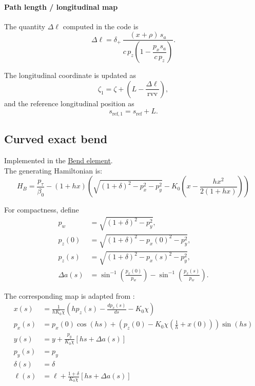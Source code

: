 \paragraph{Path length / longitudinal map}

The quantity \(\Delta \ell\) computed in the code is
\begin{equation}
\Delta \ell
=
\delta_+\,
\frac{(x+\rho)\, s_a}{c\, p_z\left(1-\dfrac{p_x s_a}{c\,p_z}\right)} .
\end{equation}

The longitudinal coordinate is updated as
\begin{equation}
\zeta_1 = \zeta + \left( L - \frac{\Delta \ell}{\mathrm{rvv}} \right),
\end{equation}
and the reference longitudinal position as
\begin{equation}
s_{\text{ref},1} = s_{\text{ref}} + L.
\end{equation}


\subsection{Curved exact bend}

Implemented in the \href{https://xsuite.readthedocs.io/en/latest/apireference.html#bend}{\underline{Bend element}}.
~\\

The generating Hamiltonian is:
\begin{equation}
H_{B} = \frac{p_\tau}{\beta_0} -(1 + hx) \left( \sqrt{(1 + \delta)^2 - p_x^2 - p_y^2} -K_0\left(x-\frac{hx^2}{2(1+hx)} \right) \right)
\end{equation}

For compactness, define
\begin{align}
p_w &= \sqrt{(1+\delta)^2-p_y^2}, \\
p_z(0) &= \sqrt{(1+\delta)^2-p_x(0)^2-p_y^2}, \\
p_z(s) &= \sqrt{(1+\delta)^2-p_x(s)^2-p_y^2}, \\
\Delta a(s) &=
\sin^{-1}\left(\frac{p_x(0)}{p_w}\right)
-\sin^{-1}\left(\frac{p_x(s)}{p_w}\right).
\end{align}

The corresponding map is adapted from \cite{forest99}:
\begin{align}
x(s) &= \frac{1}{hK_0 \chi} \left( h p_z(s) - \frac{dp_x(s)}{ds} - K_0 \chi \right) \\
p_x(s) &= p_x(0) \cos(h s) + \left( p_z(0) - K_0 \chi \left( \frac{1}{h} + x(0) \right) \right) \sin(h s) \\
y(s) &= y + \frac{p_y}{K_0\chi}\left[hs+\Delta a(s)\right] \\
p_y(s) &= p_y \\
\delta(s) &= \delta \\
\ell(s) &= \ell +
  \frac{1+\delta}{K_0\chi}\left[hs+\Delta a(s)\right]
\end{align}

